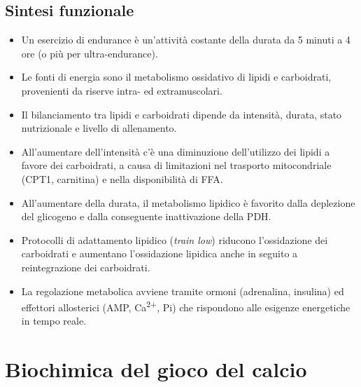 \documentclass[12pt,a4paper]{report}
\begin{document}
\section{Sintesi funzionale}
\begin{itemize}
\item Un esercizio di endurance è un'attività costante della durata da 5 minuti a 4 ore (o più per ultra-endurance).
\item Le fonti di energia sono il metabolismo ossidativo di lipidi e carboidrati, provenienti da riserve intra- ed extramuscolari.
\item Il bilanciamento tra lipidi e carboidrati dipende da intensità, durata, stato nutrizionale e livello di allenamento.
\item All'aumentare dell'intensità c'è una diminuzione dell'utilizzo dei lipidi a favore dei carboidrati, a causa di limitazioni nel trasporto mitocondriale (CPT1, carnitina) e nella disponibilità di FFA.
\item All'aumentare della durata, il metabolismo lipidico è favorito dalla deplezione del glicogeno e dalla conseguente inattivazione della PDH.
\item Protocolli di adattamento lipidico (\textit{train low}) riducono l'ossidazione dei carboidrati e aumentano l'ossidazione lipidica anche in seguito a reintegrazione dei carboidrati.
\item La regolazione metabolica avviene tramite ormoni (adrenalina, insulina) ed effettori allosterici (AMP, Ca\textsuperscript{2+}, Pi) che rispondono alle esigenze energetiche in tempo reale.
\end{itemize}

\chapter{Biochimica del gioco del calcio}
\end{document}
